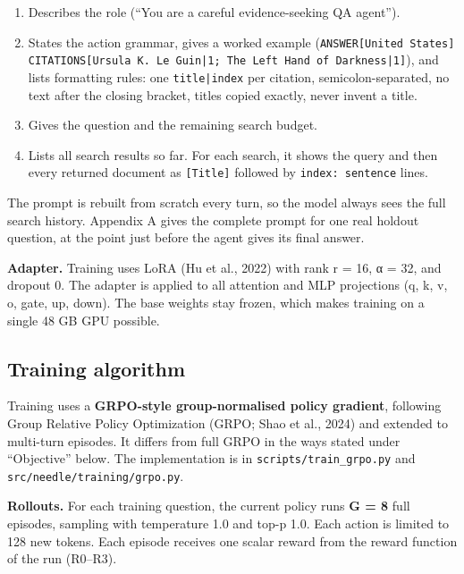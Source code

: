 \begin{enumerate}
\def\labelenumi{\arabic{enumi}.}
\tightlist
\item
  Describes the role (``You are a careful evidence-seeking QA agent'').
\item
  States the action grammar, gives a worked example
  (\texttt{ANSWER{[}\allowbreak{}United States{]} CITATIONS{[}\allowbreak{}Ursula K.\allowbreak{} Le Guin|1; The Left Hand of Darkness|1{]}}),
  and lists formatting rules: one \texttt{title|index} per citation,
  semicolon-separated, no text after the closing bracket, titles copied
  exactly, never invent a title.
\item
  Gives the question and the remaining search budget.
\item
  Lists all search results so far. For each search, it shows the query
  and then every returned document as \texttt{{[}\allowbreak{}Title{]}}
  followed by \texttt{index: sentence} lines.
\end{enumerate}

The prompt is rebuilt from scratch every turn, so the model always sees
the full search history. Appendix A gives the complete prompt for one
real holdout question, at the point just before the agent gives its
final answer.

\textbf{Adapter.} Training uses LoRA (Hu et al., 2022) with rank r = 16,
α = 32, and dropout 0. The adapter is applied to all attention and MLP
projections (q, k, v, o, gate, up, down). The base weights stay frozen,
which makes training on a single 48 GB GPU possible.

\subsection{Training algorithm}\label{sec:3.6}

Training uses a \textbf{GRPO-style group-normalised policy gradient},
following Group Relative Policy Optimization (GRPO; Shao et al., 2024)
and extended to multi-turn episodes. It differs from full GRPO in the
ways stated under ``Objective'' below. The implementation is in
\texttt{scripts/\allowbreak{}train\_\allowbreak{}grpo.\allowbreak{}py}
and
\texttt{src/\allowbreak{}needle/\allowbreak{}training/\allowbreak{}grpo.\allowbreak{}py}.

\textbf{Rollouts.} For each training question, the current policy runs
\textbf{G = 8} full episodes, sampling with temperature 1.0 and top-p
1.0. Each action is limited to 128 new tokens. Each episode receives one
scalar reward from the reward function of the run (R0--R3).

